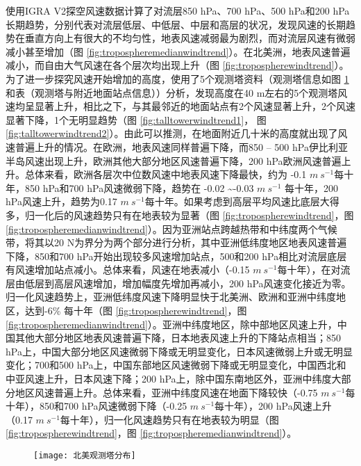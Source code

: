 使用IGRA V2探空风速数据计算了对流层850 hPa、700 hPa、500 hPa和200 hPa长期趋势，分别代表对流层低层、中低层、中层和高层的状况，发现风速的长期趋势在垂直方向上有很大的不均匀性，地表风速减弱最为剧烈，而对流层风速有微弱减小甚至增加（图 \ref{fig:tropospheremedianwindtrend}）。在北美洲，地表风速普遍减小，而自由大气风速在各个层次均出现上升（图 \ref{fig:tropospherewindtrend}）。为了进一步探究风速开始增加的高度，使用了5个观测塔资料（观测塔信息如图 \ref{fig:talltower}和表（观测塔与附近地面站点信息））分析，发现高度在40 m左右的5个观测塔风速均呈显著上升，相比之下，与其最邻近的地面站点有2个风速显著上升，2个风速显著下降，1个无明显趋势（图 \ref{fig:talltowerwindtrend1}， 图 \ref{fig:talltowerwindtrend2}）。由此可以推测，在地面附近几十米的高度就出现了风速普遍上升的情况。在欧洲，地表风速同样普遍下降，而850 – 500 hPa伊比利亚半岛风速出现上升，欧洲其他大部分地区风速普遍下降，200 hPa欧洲风速普遍上升。总体来看，欧洲各层次中位数风速中地表风速下降最快，约为 -0.1 $m ~ s^{-1}$每十年，850  hPa和700 hPa风速微弱下降，趋势在 -0.02 \textasciitilde -0.03 $m ~ s^{-1}$ 每十年，200 hPa风速上升，趋势为0.17 $m ~ s^{-1}$每十年。如果考虑到高层平均风速比底层大得多，归一化后的风速趋势只有在地表较为显著（图 \ref{fig:tropospherewindtrend}，图 \ref{fig:tropospheremedianwindtrend}）。因为亚洲站点跨越热带和中纬度两个气候带，将其以20 N为界分为两个部分进行分析，其中亚洲低纬度地区地表风速普遍下降，850和700 hPa开始出现较多风速增加站点，500和200 hPa相比对流层底层有风速增加站点减小。总体来看，风速在地表减小（-0.15 $m ~ s^{-1}$每十年），在对流层由低层到高层风速增加，增加幅度先增加再减小，200 hPa风速变化接近为零。归一化风速趋势上，亚洲低纬度风速下降明显快于北美洲、欧洲和亚洲中纬度地区，达到-6\% 每十年（图 \ref{fig:tropospherewindtrend}，图 \ref{fig:tropospheremedianwindtrend}）。亚洲中纬度地区，除中部地区风速上升，中国其他大部分地区地表风速普遍下降，日本地表风速上升的下降站点相当；850 hPa上，中国大部分地区风速微弱下降或无明显变化，日本风速微弱上升或无明显变化；700和500 hPa上，中国东部地区风速微弱下降或无明显变化，中国西北和中亚风速上升，日本风速下降；200 hPa上，除中国东南地区外，亚洲中纬度大部分地区风速普遍上升。总体来看，亚洲中纬度风速在地面下降较快（-0.75 $m ~ s^{-1}$每十年），850和700 hPa风速微弱下降（-0.25 $m ~ s^{-1}$每十年），200 hPa风速上升（0.17 $m ~ s^{-1}$每十年），归一化风速趋势只有在地表较为明显（图 \ref{fig:tropospherewindtrend}，图 \ref{fig:tropospheremedianwindtrend}）。


\begin{figure}[!htbp]
    \centering
    \texttt{[image: 北美观测塔分布]}
    \label{fig:talltower}
\end{figure}

